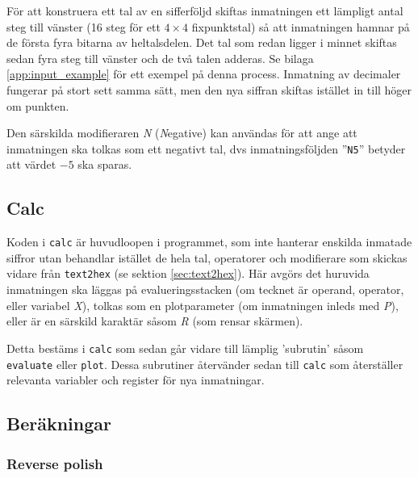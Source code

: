 \documentclass[]{article}
\begin{document}
För att konstruera ett tal av en sifferföljd skiftas inmatningen ett lämpligt antal steg till vänster (16 steg för ett $4 \times 4$ fixpunktstal) så att inmatningen hamnar på de första fyra bitarna av heltalsdelen. Det tal som redan ligger i minnet skiftas sedan fyra steg till vänster och de två talen adderas. Se bilaga \ref{app:input_example} för ett exempel på denna process. Inmatning av decimaler fungerar på stort sett samma sätt, men den nya siffran skiftas istället in till höger om punkten.

Den särskilda modifieraren \textit{N} (\textit{N}egative) kan användas för att ange att inmatningen ska tolkas som ett negativt tal, dvs inmatningsföljden ''\texttt{N5}'' betyder att värdet $-5$ ska sparas.

\subsection{Calc}
Koden i \texttt{calc} är huvudloopen i programmet, som inte hanterar enskilda inmatade siffror utan behandlar istället de hela tal, operatorer och modifierare som skickas vidare från \texttt{text2hex} (se sektion \ref{sec:text2hex}). Här avgörs det huruvida inmatningen ska läggas på evalueringsstacken (om tecknet är operand, operator, eller variabel \textit{X}), tolkas som en plotparameter (om inmatningen inleds med \textit{P}), eller är en särskild karaktär såsom \textit{R} (som rensar skärmen).

Detta bestäms i \texttt{calc} som sedan går vidare till lämplig 'subrutin' såsom \texttt{evaluate} eller \texttt{plot}. Dessa subrutiner återvänder sedan till \texttt{calc} som återställer relevanta variabler och register för nya inmatningar.

\subsection{Beräkningar}
\subsubsection{Reverse polish}
\label{sec:reversepolish}
\end{document}
